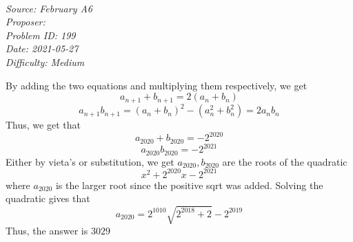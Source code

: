 \SSbreak\\
\emph{Source:  February A6}\\
\emph{Proposer: \Pchan}\\
\emph{Problem ID: 199}\\
\emph{Date: 2021-05-27}\\
\emph{Difficulty: Medium}
\SSbreak
 

\begin{solution}\hfil\medskip
By adding the two equations and multiplying them respectively, we get 
\[
a_{n+1} + b_{n+1} = 2(a_n+b_n)
\]
\[
a_{n+1}b_{n+1} = (a_n+b_n)^2 - (a_n^2 + b_n^2) = 2 a_nb_n
\]
Thus, we get that 
\[
a_{2020} + b_{2020} = -2^{2020}
\]
\[
a_{2020}b_{2020} = -2^{2021}
\]
Either by vieta's or substitution, we get $a_{2020}, b_{2020}$ are the roots of  the quadratic
\[
x^2 +2^{2020}x - 2^{2021}
\]
where $a_{2020}$ is the larger root since the positive sqrt was added. Solving the quadratic gives that 
\[
a_{2020} = 2^{1010}\sqrt{2^{2018} + 2} - 2^{2019}
\]
Thus, the answer is $\boxed{3029}$
\end{solution}
